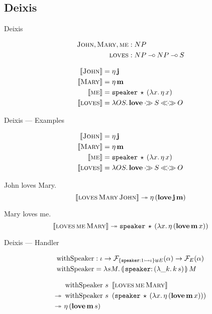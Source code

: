 \documentclass{beamer}
\begin{document}
\subsection{Deixis}

\begin{frame}{Deixis}

\begin{align*}
  \textsc{John}, \textsc{Mary}, \textsc{me} &: NP \\
  \textsc{loves} &: NP \mathbin{{-}\mkern-3.5mu{\circ}} NP \mathbin{{-}\mkern-3.5mu{\circ}} S
\end{align*}

\begin{align*}
  \llbracket \textsc{John} \rrbracket &= \eta\,\textbf{j} \\
  \llbracket \textsc{Mary} \rrbracket &= \eta\,\textbf{m} \\
  \llbracket \textsc{me} \rrbracket &= \mathtt{speaker}\,\star\,(\lambda x.\, \eta\,x) \\
  \llbracket \textsc{loves} \rrbracket &= \lambda O S.\, {\textbf{love}} \mathbin{\cdot\!\!\gg} S \mathbin{\ll\!\!\cdot\!\!\gg} O
\end{align*}
\end{frame}


\begin{frame}{Deixis --- Examples}

\begin{align*}
  \llbracket \textsc{John} \rrbracket &= \eta\,\textbf{j} \\
  \llbracket \textsc{Mary} \rrbracket &= \eta\,\textbf{m} \\
  \llbracket \textsc{me} \rrbracket &= \mathtt{speaker}\,\star\,(\lambda x.\, \eta\,x) \\
  \llbracket \textsc{loves} \rrbracket &= \lambda O S.\, {\textbf{love}} \mathbin{\cdot\!\!\gg} S \mathbin{\ll\!\!\cdot\!\!\gg} O
\end{align*}

  John loves Mary.
  $$
  \llbracket \textsc{loves}\,\textsc{Mary}\,\textsc{John} \rrbracket \twoheadrightarrow 
  \eta\,(\textbf{love}\,\textbf{j}\,\textbf{m})
  $$
  
  Mary loves me.
  $$
  \llbracket \textsc{loves}\,\textsc{me}\,\textsc{Mary} \rrbracket \twoheadrightarrow
  \mathtt{speaker}\,\star\,(\lambda x.\, \eta\,(\textbf{love}\,\textbf{m}\,x))
  $$
\end{frame}


\begin{frame}{Deixis --- Handler}

  \begin{align*}
  \withSpeaker &: \iota \to \FF_{\{\typedop{speaker}{1}{\iota}\} \uplus
    E}(\alpha) \to \FF_E(\alpha) \\
  \withSpeaker &= \lam{s M}{\ap{\banana{\onto{\op{speaker}}{(\lam{\_ k}{\ap{k}{s}})}}}{M}}
  \end{align*}

  \vfill
  \pause
  
  \begin{align*}
  &\app{\withSpeaker}{s}{\ \sem{\app{\abs{loves}}{\abs{me}}{\abs{Mary}}}} \\
  \tto\ &\app{\withSpeaker}{s}{\ (\app{\op{speaker}}{\star}{(\lam{x}{\etaE{(\app{\obj{love}}{\obj{m}}{x})}})})} \\
  \tto\ &\etaE{(\app{\obj{love}}{\obj{m}}{s})}
  \end{align*}
\end{frame}
\end{document}
